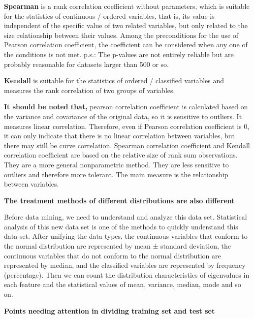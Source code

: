 \textbf{Spearman} is a rank correlation coefficient without parameters, which is suitable for the statistics of continuous / ordered variables, that is, its value is independent of the specific value of two related variables, but only related to the size relationship between their values. Among the preconditions for the use of Pearson correlation coefficient, the coefficient can be considered when any one of the conditions is not met.
p.s.: The p-values are not entirely reliable but are probably reasonable for datasets larger than 500 or so.

\textbf{Kendall} is suitable for the statistics of ordered / classified variables and measures the rank correlation of two groups of variables.

\textbf{It should be noted that,} pearson correlation coefficient is calculated based on the variance and covariance of the original data, so it is sensitive to outliers. It measures linear correlation. Therefore, even if Pearson correlation coefficient is 0, it can only indicate that there is no linear correlation between variables, but there may still be curve correlation. Spearman correlation coefficient and Kendall correlation coefficient are based on the relative size of rank sum observations. They are a more general nonparametric method. They are less sensitive to outliers and therefore more tolerant. The main measure is the relationship between variables.

\textbf{The treatment methods of different distributions are also different}

Before data mining, we need to understand and analyze this data set. Statistical analysis of this new data set is one of the methods to quickly understand this data set. After unifying the data types, the continuous variables that conform to the normal distribution are represented by mean ± standard deviation, the continuous variables that do not conform to the normal distribution are represented by median, and the classified variables are represented by frequency (percentage). Then we can count the distribution characteristics of eigenvalues in each feature and the statistical values of mean, variance, median, mode and so on.

\textbf{Points needing attention in dividing training set and test set}


